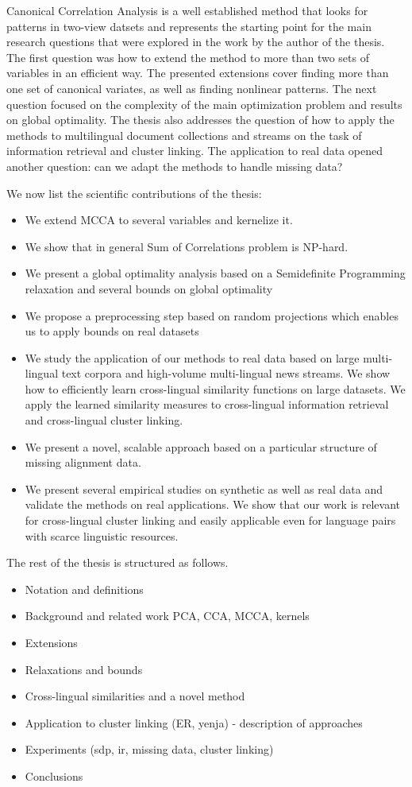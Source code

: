 Canonical Correlation Analysis is a well established method that looks for patterns in two-view datsets and represents
the starting point for the main research questions that were explored in the work by the author of the thesis. The
first question was how to extend the method to more than two sets of variables in an efficient way. The presented extensions
cover finding more than one set of canonical variates, as well as finding nonlinear patterns. The
next question focused on the complexity of the main optimization problem and results on global optimality.
The thesis also addresses the question of how to apply the methods to multilingual document collections and streams
on the task of information retrieval and cluster linking. The application to real data opened another question: can
we adapt the methods to handle missing data?

We now list the scientific contributions of the thesis:
\begin{itemize}
\item We extend MCCA to several variables and kernelize it.
\item We show that in general Sum of Correlations problem is NP-hard.
\item We present a global optimality analysis based on a Semidefinite Programming relaxation and several bounds on global optimality
\item We propose a preprocessing step based on random projections which enables us to apply bounds on real datasets
\item We study the application of our methods to real data based on large multi-lingual text corpora and high-volume multi-lingual news streams. We show how to efficiently learn cross-lingual similarity functions on large datasets. We apply the learned similarity measures to cross-lingual information retrieval and
    cross-lingual cluster linking.
\item We present a novel, scalable approach based on a particular structure of missing alignment data.
\item We present several empirical studies on synthetic as well as real data and validate the methods on real applications. We show that our work is relevant for cross-lingual cluster linking and easily applicable even for language pairs with scarce linguistic resources.
\end{itemize}

The rest of the thesis is structured as follows.
\begin{itemize}
\item Notation and definitions
\item Background and related work PCA, CCA, MCCA, kernels
\item Extensions
\item Relaxations and bounds
\item Cross-lingual similarities and a novel method
\item Application to cluster linking (ER, yenja) - description of approaches
\item Experiments (sdp, ir, missing data, cluster linking)
\item Conclusions
\end{itemize}

